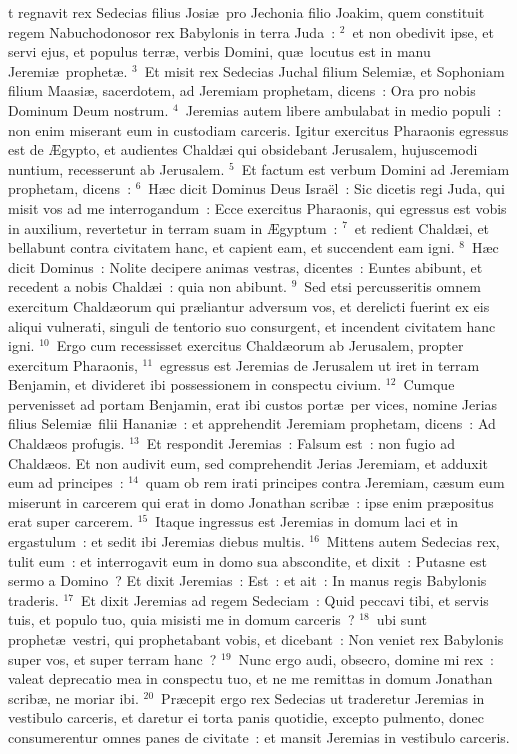 \bchapter
{}t regnavit rex Sedecias filius Josi\ae\ pro Jechonia filio Joakim, quem constituit regem Nabuchodonosor rex Babylonis in terra Juda~:
${}^{2}$~et non obedivit ipse, et servi ejus, et populus terr\ae , verbis Domini, qu\ae\ locutus est in manu Jeremi\ae\ prophet\ae .
${}^{3}$~Et misit rex Sedecias Juchal filium Selemi\ae , et Sophoniam filium Maasi\ae , sacerdotem, ad Jeremiam prophetam, dicens~: Ora pro nobis Dominum Deum nostrum.
${}^{4}$~Jeremias autem libere ambulabat in medio populi~: non enim miserant eum in custodiam carceris. Igitur exercitus Pharaonis egressus est de \AE gypto, et audientes Chald\ae i qui obsidebant Jerusalem, hujuscemodi nuntium, recesserunt ab Jerusalem.
${}^{5}$~Et factum est verbum Domini ad Jeremiam prophetam, dicens~:
${}^{6}$~H\ae c dicit Dominus Deus Isra\"el~: Sic dicetis regi Juda, qui misit vos ad me interrogandum~: Ecce exercitus Pharaonis, qui egressus est vobis in auxilium, revertetur in terram suam in \AE gyptum~:
${}^{7}$~et redient Chald\ae i, et bellabunt contra civitatem hanc, et capient eam, et succendent eam igni.
${}^{8}$~H\ae c dicit Dominus~: Nolite decipere animas vestras, dicentes~: Euntes abibunt, et recedent a nobis Chald\ae i~: quia non abibunt.
${}^{9}$~Sed etsi percusseritis omnem exercitum Chald\ae orum qui pr\ae liantur adversum vos, et derelicti fuerint ex eis aliqui vulnerati, singuli de tentorio suo consurgent, et incendent civitatem hanc igni.
${}^{10}$~Ergo cum recessisset exercitus Chald\ae orum ab Jerusalem, propter exercitum Pharaonis,
${}^{11}$~egressus est Jeremias de Jerusalem ut iret in terram Benjamin, et divideret ibi possessionem in conspectu civium.
${}^{12}$~Cumque pervenisset ad portam Benjamin, erat ibi custos port\ae\ per vices, nomine Jerias filius Selemi\ae\ filii Hanani\ae~: et apprehendit Jeremiam prophetam, dicens~: Ad Chald\ae os profugis.
${}^{13}$~Et respondit Jeremias~: Falsum est~: non fugio ad Chald\ae os. Et non audivit eum, sed comprehendit Jerias Jeremiam, et adduxit eum ad principes~:
${}^{14}$~quam ob rem irati principes contra Jeremiam, c\ae sum eum miserunt in carcerem qui erat in domo Jonathan scrib\ae~: ipse enim pr\ae positus erat super carcerem.
${}^{15}$~Itaque ingressus est Jeremias in domum laci et in ergastulum~: et sedit ibi Jeremias diebus multis.
${}^{16}$~Mittens autem Sedecias rex, tulit eum~: et interrogavit eum in domo sua abscondite, et dixit~: Putasne est sermo a Domino~? Et dixit Jeremias~: Est~: et ait~: In manus regis Babylonis traderis.
${}^{17}$~Et dixit Jeremias ad regem Sedeciam~: Quid peccavi tibi, et servis tuis, et populo tuo, quia misisti me in domum carceris~?
${}^{18}$~ubi sunt prophet\ae\ vestri, qui prophetabant vobis, et dicebant~: Non veniet rex Babylonis super vos, et super terram hanc~?
${}^{19}$~Nunc ergo audi, obsecro, domine mi rex~: valeat deprecatio mea in conspectu tuo, et ne me remittas in domum Jonathan scrib\ae , ne moriar ibi.
${}^{20}$~Pr\ae cepit ergo rex Sedecias ut traderetur Jeremias in vestibulo carceris, et daretur ei torta panis quotidie, excepto pulmento, donec consumerentur omnes panes de civitate~: et mansit Jeremias in vestibulo carceris.

